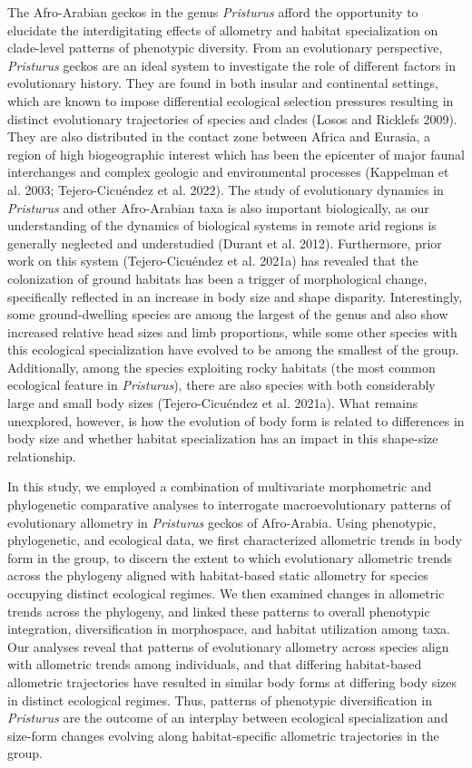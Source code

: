 \documentclass[
  11pt,
]{article}
\begin{document}
The Afro-Arabian geckos in the genus \emph{Pristurus} afford the
opportunity to elucidate the interdigitating effects of allometry and
habitat specialization on clade-level patterns of phenotypic diversity.
From an evolutionary perspective, \emph{Pristurus} geckos are an ideal
system to investigate the role of different factors in evolutionary
history. They are found in both insular and continental settings, which
are known to impose differential ecological selection pressures
resulting in distinct evolutionary trajectories of species and clades
(Losos and Ricklefs 2009). They are also distributed in the contact zone
between Africa and Eurasia, a region of high biogeographic interest
which has been the epicenter of major faunal interchanges and complex
geologic and environmental processes (Kappelman et al. 2003;
Tejero-Cicuéndez et al. 2022). The study of evolutionary dynamics in
\emph{Pristurus} and other Afro-Arabian taxa is also important
biologically, as our understanding of the dynamics of biological systems
in remote arid regions is generally neglected and understudied (Durant
et al. 2012). Furthermore, prior work on this system (Tejero-Cicuéndez
et al. 2021a) has revealed that the colonization of ground habitats has
been a trigger of morphological change, specifically reflected in an
increase in body size and shape disparity. Interestingly, some
ground-dwelling species are among the largest of the genus and also show
increased relative head sizes and limb proportions, while some other
species with this ecological specialization have evolved to be among the
smallest of the group. Additionally, among the species exploiting rocky
habitats (the most common ecological feature in \emph{Pristurus}), there
are also species with both considerably large and small body sizes
(Tejero-Cicuéndez et al. 2021a). What remains unexplored, however, is
how the evolution of body form is related to differences in body size
and whether habitat specialization has an impact in this shape-size
relationship. \hfill\break

In this study, we employed a combination of multivariate morphometric
and phylogenetic comparative analyses to interrogate macroevolutionary
patterns of evolutionary allometry in \emph{Pristurus} geckos of
Afro-Arabia. Using phenotypic, phylogenetic, and ecological data, we
first characterized allometric trends in body form in the group, to
discern the extent to which evolutionary allometric trends across the
phylogeny aligned with habitat-based static allometry for species
occupying distinct ecological regimes. We then examined changes in
allometric trends across the phylogeny, and linked these patterns to
overall phenotypic integration, diversification in morphospace, and
habitat utilization among taxa. Our analyses reveal that patterns of
evolutionary allometry across species align with allometric trends among
individuals, and that differing habitat-based allometric trajectories
have resulted in similar body forms at differing body sizes in distinct
ecological regimes. Thus, patterns of phenotypic diversification in
\emph{Pristurus} are the outcome of an interplay between ecological
specialization and size-form changes evolving along habitat-specific
allometric trajectories in the group.
\end{document}
